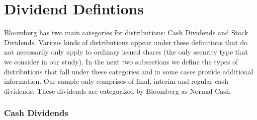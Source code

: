 \documentclass[11pt,preprint, authoryear]{elsarticle}
\numberwithin{equation}{section}
\numberwithin{figure}{section}
\numberwithin{table}{section}
\begin{document}
\hypertarget{dividend-defintions}{%
\section*{Dividend Defintions}\label{dividend-defintions}}

Bloomberg has two main categories for distributions: Cash Dividends and
Stock Dividends. Various kinds of distributions appear under these
definitions that do not necessarily only apply to ordinary issued shares
(the only security type that we consider in our study). In the next two
subsections we define the types of distributions that fall under these
categories and in some cases provide additional information. Our sample
only comprises of final, interim and regular cash dividends. These
dividends are categorized by Bloomberg as Normal Cash.

\hypertarget{cash-dividends}{%
\subsubsection*{Cash Dividends}\label{cash-dividends}}
\end{document}
